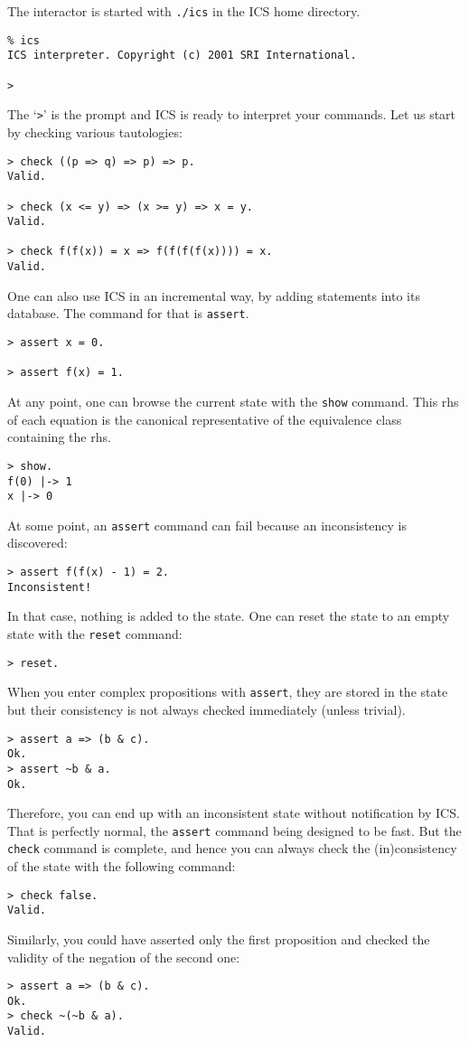 \documentclass[12pt]{article}
\begin{document}
The interactor is started with \texttt{./ics} in the ICS home directory.
\begin{verbatim}
% ics
ICS interpreter. Copyright (c) 2001 SRI International.

> 
\end{verbatim}
The `\texttt{>}' is the prompt and ICS is ready to interpret your commands.
Let us start by checking various tautologies:
\begin{verbatim}
> check ((p => q) => p) => p.
Valid.

> check (x <= y) => (x >= y) => x = y.
Valid.

> check f(f(x)) = x => f(f(f(f(x)))) = x. 
Valid.
\end{verbatim}
One can also use ICS in an incremental way, by adding statements into
its database. The command for that is \texttt{assert}.
\begin{verbatim}
> assert x = 0.

> assert f(x) = 1.
\end{verbatim}
At any point, one can browse the current state with the
\texttt{show} command. This rhs of each equation is
the canonical representative of the equivalence class
containing the rhs.
\begin{verbatim}
> show.
f(0) |-> 1
x |-> 0
\end{verbatim}
At some point, an \texttt{assert} command can fail because an
inconsistency is discovered:
\begin{verbatim}
> assert f(f(x) - 1) = 2.
Inconsistent!
\end{verbatim}
In that case, nothing is added to the state.
One can reset the state to an empty state with the \texttt{reset}
command:
\begin{verbatim}
> reset.          
\end{verbatim}
When you enter complex propositions with \texttt{assert}, they are
stored in the state but their consistency is not always checked
immediately (unless trivial).
\begin{verbatim}
> assert a => (b & c).
Ok.
> assert ~b & a.
Ok.
\end{verbatim}
Therefore, you can end up with an inconsistent state without
notification by ICS.  That is perfectly normal, the \texttt{assert}
command being designed to be fast. But the \texttt{check} command is
complete, and hence you can always check the (in)consistency of the
state with the following command:
\begin{verbatim}
> check false.
Valid.
\end{verbatim}
Similarly, you could have asserted only the first proposition and
checked the validity of the negation of the second one:
\begin{verbatim}
> assert a => (b & c).
Ok.
> check ~(~b & a).
Valid.
\end{verbatim}
\end{document}

